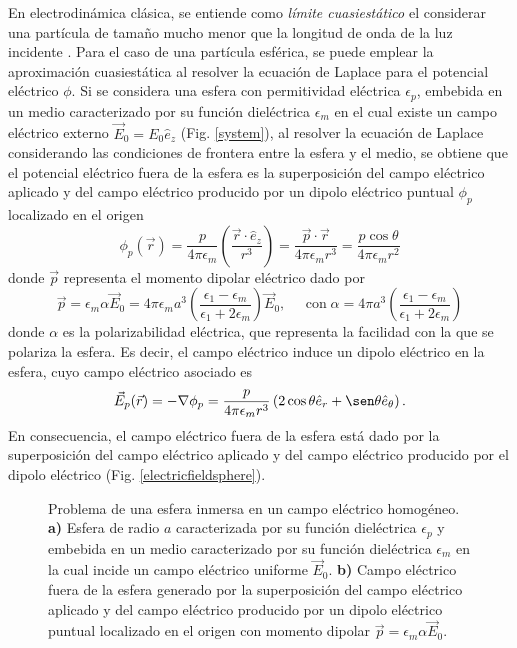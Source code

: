 En electrodinámica clásica, se entiende como \textit{límite cuasiestático} el considerar una partícula de tamaño mucho menor que la longitud de onda de la luz incidente \cite{Cuasiestatico}. Para el caso de una partícula esférica, se puede emplear la aproximación cuasiestática al resolver la ecuación de Laplace para el potencial eléctrico $\phi$. Si se considera una esfera con permitividad eléctrica $\epsilon_p$, embebida en un medio caracterizado por su función dieléctrica $\epsilon_m$ en el cual existe un campo eléctrico externo $\Vec{E}_0=E_0\hat{e}_z$ (Fig. \ref{system}), al resolver la ecuación de Laplace considerando las condiciones de frontera entre la esfera y el medio, se obtiene que el potencial eléctrico fuera de la esfera es la superposición del campo eléctrico aplicado y del campo eléctrico producido por un dipolo eléctrico puntual $\phi_p$ localizado en el origen \cite{Griffiths}
\begin{equation}
	\phi_p(\vec{r})=\frac{p}{4\pi\epsilon_m}\left(\frac{\Vec{r}\cdot\hat{e}_z}{r^3}\right)=\frac{\Vec{p}\cdot\Vec{r}}{4\pi\epsilon_m r^3}=\frac{p\cos\theta}{4\pi\epsilon_m r^2}
	\label{pot_dipolo}
\end{equation}
donde $\Vec{p}$ representa el momento dipolar eléctrico dado por \cite{Bohren}
\begin{equation*}
	\vec{p}= \epsilon_m\alpha\Vec{E}_0=4\pi\epsilon_m a^3\left(\frac{\epsilon_1-\epsilon_m}{\epsilon_1+2\epsilon_m}\right)\Vec{E}_0, \;\:\:\:\:\: \text{con}\; \alpha=4\pi a^3\left(\frac{\epsilon_1-\epsilon_m}{\epsilon_1+2\epsilon_m}\right) 
	\label{momentdipol}
\end{equation*}
donde $\alpha$ es la polarizabilidad eléctrica, que representa la facilidad con la que se polariza la esfera. Es decir, el campo eléctrico induce un dipolo eléctrico en la esfera, cuyo campo eléctrico asociado es 
\begin{equation*}
	\Vec{E}_p(\vec{r})=-\nabla \phi_p =\frac{p}{4\pi \epsilon_m r^3 }\left(2\cos\theta\hat{e}_r+\sen\theta\hat{e}_{\theta}\right).
\end{equation*}
En consecuencia, el campo eléctrico fuera de la esfera está dado por la superposición del campo eléctrico aplicado y del campo eléctrico producido por el dipolo eléctrico (Fig. \ref{electricfieldsphere}).


\begin{figure}[H]
	\centering
	\caption{Problema de una esfera inmersa en un campo eléctrico homogéneo. \textbf{a)} Esfera de radio $a$ caracterizada por su función dieléctrica $\epsilon_p$ y embebida en un medio caracterizado por su función dieléctrica $\epsilon_m$ en la cual incide un campo eléctrico uniforme $\Vec{E}_0$. \textbf{b)} Campo eléctrico fuera de la esfera generado por la superposición del campo eléctrico aplicado y del campo eléctrico producido por un dipolo eléctrico puntual localizado en el origen con momento dipolar $\vec{p}= \epsilon_m\alpha\Vec{E}_0$.}
	\label{steady_state}
\end{figure}
 

